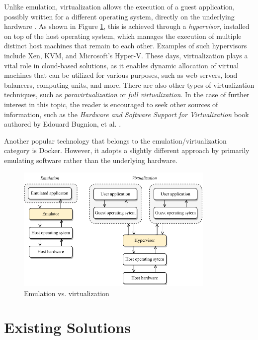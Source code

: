 \documentclass[english, ing, kiv, he, iso690numb, pdf]{fasthesis}
\begin{document}
	Unlike emulation, virtualization allows the execution of a guest application, possibly written for a different operating system, directly on the underlying hardware \cite{computer-virtualization}. As shown in Figure \ref{Emulation vs. virtualization}, this is achieved through a \textit{hypervisor}, installed on top of the host operating system, which manages the execution of multiple distinct host machines that remain  to each other. Examples of such hypervisors include Xen, KVM, and Microsoft's Hyper-V. These days, virtualization plays a vital role in cloud-based solutions, as it enables dynamic allocation of virtual machines that can be utilized for various purposes, such as web servers, load balancers, computing units, and more. There are also other types of virtualization techniques, such as \textit{paravirtualization} or \textit{full virtualization}. In the case of further interest in this topic, the reader is encouraged to seek other sources of information, such as the \textit{Hardware and Software Support for Virtualization} book authored by Edouard Bugnion, \break et al. \cite{computer-virtualization-other}.
	
	Another popular technology that belongs to the emulation/virtualization category is Docker. However, it adopts a slightly different approach by primarily emulating software rather than the underlying hardware.
	
	\begin{figure}[ht]
		\centering
		\includegraphics[width=0.85\textwidth]{img/diagrams/emulation_vs_virtualization.pdf}
		\caption{Emulation vs. virtualization}
		\label{Emulation vs. virtualization}
	\end{figure}
	
	\section{Existing Solutions}
	
\end{document}
